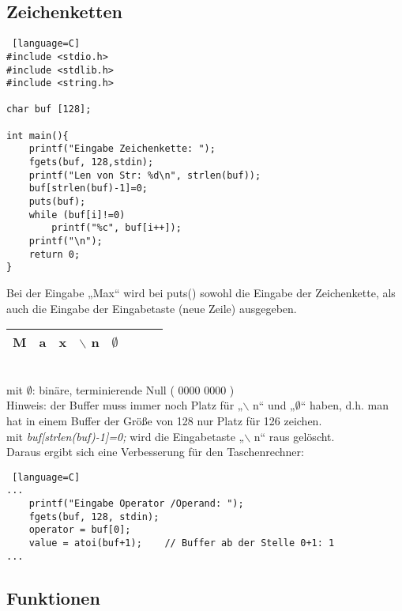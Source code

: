 \subsection{Zeichenketten}
\begin{lstlisting} [language=C]
#include <stdio.h>
#include <stdlib.h>
#include <string.h>

char buf [128];

int main(){
	printf("Eingabe Zeichenkette: ");
	fgets(buf, 128,stdin);
	printf("Len von Str: %d\n", strlen(buf));
	buf[strlen(buf)-1]=0;
	puts(buf);
	while (buf[i]!=0)
		printf("%c", buf[i++]);
	printf("\n");
	return 0;
}
\end{lstlisting}
Bei der Eingabe „Max“ wird bei puts() sowohl die Eingabe der Zeichenkette, als auch die Eingabe der Eingabetaste (neue Zeile) ausgegeben.\\
\begin{tabular}{|l | l |l |l |l |l |l |l }
\hline
M & a & x & $\backslash$ n & $\emptyset$ &\; &\;&\;\\
\hline
\end{tabular}\\
mit $\emptyset$: binäre, terminierende Null ( 0000 0000 )\\
Hinweis: der Buffer muss immer noch Platz für „$\backslash$ n“ und „$\emptyset$“ haben, d.h. man hat in einem Buffer der Größe von 128 nur Platz für 126 zeichen.\\
mit \emph{buf[strlen(buf)-1]=0;} wird die Eingabetaste „$\backslash$ n“ raus gelöscht.\bigskip\\
Daraus ergibt sich eine Verbesserung für den Taschenrechner:
\begin{lstlisting} [language=C]
...
	printf("Eingabe Operator /Operand: ");
	fgets(buf, 128, stdin);
	operator = buf[0];
	value = atoi(buf+1);	// Buffer ab der Stelle 0+1: 1
...
\end{lstlisting}

\subsection{Funktionen}

